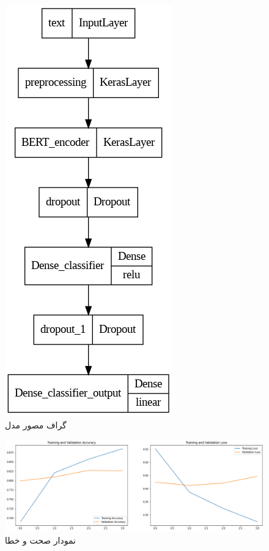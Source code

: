 \documentclass{article}
\begin{document}
\begin{figure}[!h]
    \centering\includegraphics[scale=.55]{./p2-1}
    \caption{گراف مصور مدل}\label{fig.21}
\end{figure}

\cleardoublepage

\begin{figure}[!h]
    \centering\includegraphics[scale=.45]{./p2-2}
    \caption{نمودار صحت و خطا}\label{fig.22}
\end{figure}
\end{document}
